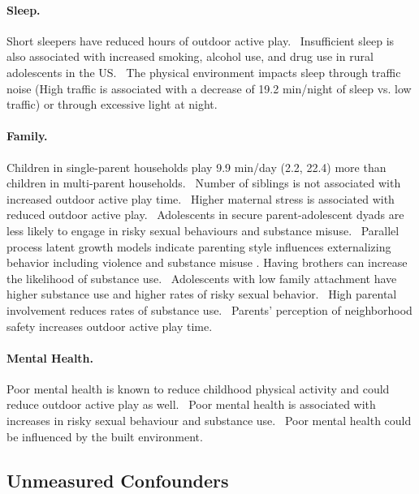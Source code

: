 \documentclass [11pt]{article}
\begin{document}
\paragraph{Sleep.} Short sleepers have reduced hours of outdoor active play.~\cite{Kjeldsen2014-kc} Insufficient sleep is also associated with increased smoking, alcohol use, and drug use in rural adolescents in the US.~\cite{Reichenberger2016-cg} The physical environment impacts sleep through traffic noise (High traffic is associated with a decrease of 19.2 min/night of sleep vs. low traffic) or through excessive light at night.~\cite{Bottino2012-ja} 

\paragraph{Family.} Children in single-parent households play 9.9 min/day (2.2, 22.4) more than children in multi-parent households.~\cite{Bringolf-Isler2010-ma} Number of siblings is not associated with increased outdoor active play time.~\cite{Arcury2017-jd} Higher maternal stress is associated with reduced outdoor active play.~\cite{OConnor2017-fq} Adolescents in secure parent-adolescent dyads are less likely to engage in risky sexual behaviours and substance misuse.~\cite{Kobak2017-ia} Parallel process latent growth models indicate parenting style influences externalizing behavior including violence and substance misuse \cite{Wiggins2015-on}. Having brothers can increase the likelihood of substance use.~\cite{Samek2015-sm} Adolescents with low family attachment have higher substance use and higher rates of risky sexual behavior.~\cite{Cordova2016-rb,Samek2015-sm} High parental involvement reduces rates of substance use.~\cite{Samek2015-sm} Parents' perception of neighborhood safety increases outdoor active play time.~\cite{Xu2017-ar}

\paragraph{Mental Health.} Poor mental health is known to reduce childhood physical activity and could reduce outdoor active play as well.~\cite{Boone2016-np} Poor mental health is associated with increases in risky sexual behaviour and substance use.~\cite{McLaren2017-gl} Poor mental health could be influenced by the built environment.~\cite{Min2017-di,Reklaitiene2014-vj}

\subsection{Unmeasured Confounders}
\end{document}
